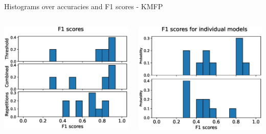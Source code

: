 \begin{frame}[fragile]{Histograms over accuracies and F1 scores - KMFP}
\begin{columns}
  \includegraphics[width=\textwidth]{files/figs/res/kmfp/f1.eps}

  \includegraphics[width=\textwidth]{files/figs/res/kmfp/f1-ind.eps}
\end{columns}
\end{frame}


